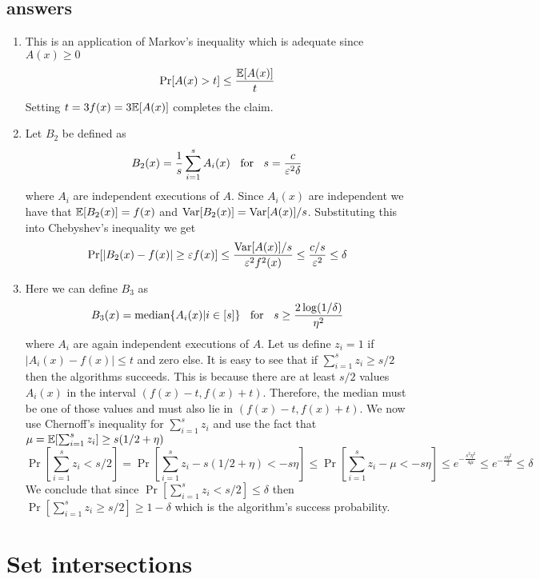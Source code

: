 \subsection*{answers}
\begin{enumerate}
\item This is an application of Markov's inequality which is adequate since $A(x) \ge 0$
\[
\Pr[A(x) > t] \le \frac{{\mathbb E}[A(x)]}{t}
\]
Setting $t = 3f(x) = 3{\mathbb E}[A(x)]$ completes the claim. 
\item Let $B_2$ be defined as 
\[
B_2(x) = \frac{1}{s}\sum_{i=1}^{s}A_{i}(x) \mbox{\;\; for \;\;} s=\frac{c}{\varepsilon^2\delta}
\]
where $A_{i}$ are independent executions of $A$.
Since $A_{i}(x)$ are independent we have that ${\mathbb E}[B_2(x)] = f(x)$ and ${\operatorname{Var}}[B_2(x)] = {\operatorname{Var}}[A(x)]/s$.
Substituting this into Chebyshev's inequality we get
\[
\Pr[|B_2(x) - f(x)| \ge \varepsilon f(x)] \le \frac{{\operatorname{Var}}[A(x)]/s}{\varepsilon^2 f^2(x)} \le  \frac{c/s}{\varepsilon^2} \le \delta
\] 
\item Here we can define $B_3$ as
\[
B_3(x) = \operatorname{median} \{A_{i}(x) | i \in [s]\} \mbox{\;\; for \;\;} s \ge \frac{2 \log(1/\delta)}{\eta^2}
\]
where $A_{i}$ are again independent executions of $A$.
Let us define $z_i =1$ if $|A_i(x) - f(x) | \le t$ and zero else.
It is easy to see that if $\sum_{i=1}^{s}z_i \ge s/2$ then the algorithms succeeds.
This is because there are at least $s/2$ values $A_i(x)$ in the interval $(f(x)-t,f(x)+t)$. 
Therefore, the median must be one of those values and must also lie in $(f(x)-t,f(x)+t)$. 
We now use Chernoff's inequality for $\sum_{i=1}^{s}z_i$ and use the fact that $\mu = {\mathbb E}[\sum_{i=1}^{s}z_i] \ge s(1/2+\eta)$
\[
\Pr[\sum_{i=1}^{s}z_i < s/2] = \Pr[\sum_{i=1}^{s}z_i - s(1/2+\eta) < -s\eta] \le \Pr[\sum_{i=1}^{s}z_i - \mu < - s\eta] \le e^{-\frac{s^2\eta^2}{4\mu}} \le e^{-\frac{s\eta^2}{2}} \le \delta 
\]
We conclude that since $\Pr[\sum_{i=1}^{s}z_i < s/2] \le \delta$ then $\Pr[\sum_{i=1}^{s}z_i \ge s/2] \ge 1-\delta$ which is the algorithm's success probability.
\end{enumerate}


\pagebreak

\section{Set intersections} 
